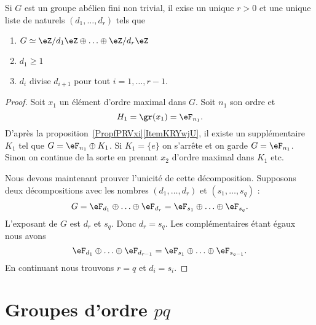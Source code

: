 \begin{theorem} \label{ThoRJWVJd}
	Si \( G\) est un groupe abélien fini non trivial, il exise un unique \( r>0\) et une unique liste de naturels \( (d_1,\ldots, d_r)\) tels que
	\begin{enumerate}
		\item
		      $G\simeq \eZ/d_1\eZ\oplus\ldots\oplus \eZ/d_r\eZ$
		\item
		      \( d_1\geq 1\)
		\item
		      \( d_i\) divise \( d_{i+1}\) pour tout \( i=1,\ldots, r-1\).
	\end{enumerate}
\end{theorem}

\begin{proof}
	Soit \( x_1\) un élément d'ordre maximal dans \( G\). Soit \( n_1\) son ordre et
	\begin{equation}
		H_1=\gr(x_1)=\eF_{n_1}.
	\end{equation}
	D'après la proposition~\ref{PropfPRVxi}\ref{ItemKRYwjU}, il existe un supplémentaire \( K_1\) tel que \( G=\eF_{n_1}\oplus K_1\). Si \( K_1=\{ e \}\) on s'arrête et on garde \( G=\eF_{n_1}\). Sinon on continue de la sorte en prenant \( x_2\) d'ordre maximal dans \( K_1\) etc.

	Nous devons maintenant prouver l'unicité de cette décomposition. Supposons deux décompositions avec les nombres \( (d_1,\ldots, d_r)\) et \( (s_1,\ldots, s_q)\) :
	\begin{equation}
		G=\eF_{d_1}\oplus\ldots\oplus \eF_{d_r}=\eF_{s_1}\oplus\ldots\oplus \eF_{s_q}.
	\end{equation}
	L'exposant de \( G\) est \( d_r\) et \( s_q\). Donc \( d_r=s_q\). Les complémentaires étant égaux nous avons
	\begin{equation}
		\eF_{d_1}\oplus\ldots\oplus \eF_{d_{r-1}}=\eF_{s_1}\oplus\ldots\oplus \eF_{s_{q-1}}.
	\end{equation}
	En continuant nous trouvons \( r=q\) et \( d_i=s_i\).
\end{proof}

\section{Groupes d'ordre \texorpdfstring{\(  pq\)}{pq}}

